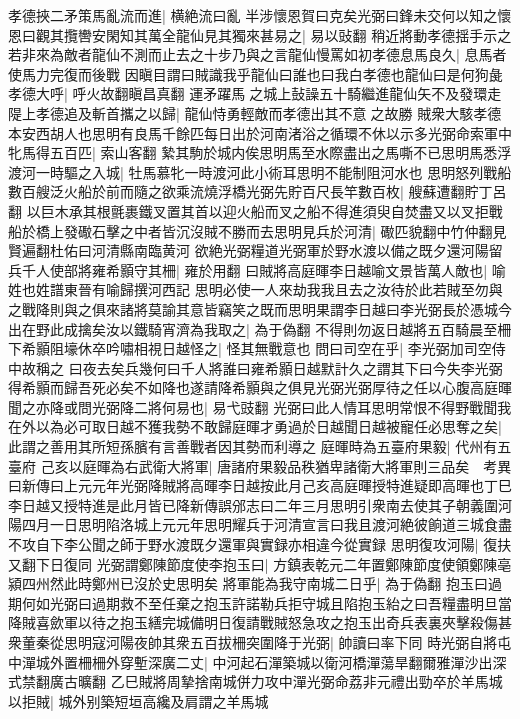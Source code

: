 孝德挾二矛策馬亂流而進|{
	横絶流曰亂}
半涉懷恩賀曰克矣光弼曰鋒未交何以知之懷恩曰觀其攬轡安閑知其萬全龍仙見其獨來甚易之|{
	易以䜴翻}
稍近將動孝德揺手示之若非來為敵者龍仙不測而止去之十步乃與之言龍仙慢罵如初孝德息馬良久|{
	息馬者使馬力完復而後戰}
因瞋目謂曰賊識我乎龍仙曰誰也曰我白孝德也龍仙曰是何狗彘孝德大呼|{
	呼火故翻瞋昌真翻}
運矛躍馬之城上鼔譟五十騎繼進龍仙矢不及發環走隄上孝德追及斬首攜之以歸|{
	龍仙恃勇輕敵而孝德出其不意之故勝}
賊衆大駭孝德本安西胡人也思明有良馬千餘匹每日出於河南渚浴之循環不休以示多光弼命索軍中牝馬得五百匹|{
	索山客翻}
縶其駒於城内俟思明馬至水際盡出之馬嘶不已思明馬悉浮渡河一時驅之入城|{
	牡馬慕牝一時渡河此小術耳思明不能制阻河水也}
思明怒列戰船數百艘泛火船於前而隨之欲乘流燒浮橋光弼先貯百尺長竿數百枚|{
	艘蘇遭翻貯丁呂翻}
以巨木承其根氈裹鐵叉置其首以迎火船而叉之船不得進須臾自焚盡又以叉拒戰船於橋上發礮石擊之中者皆沉沒賊不勝而去思明見兵於河清|{
	礮匹貌翻中竹仲翻見賢遍翻杜佑曰河清縣南臨黄河}
欲絶光弼糧道光弼軍於野水渡以備之既夕還河陽留兵千人使部將雍希顥守其柵|{
	雍於用翻}
曰賊將高庭暉李日越喻文景皆萬人敵也|{
	喻姓也姓譜東晉有喻歸撰河西記}
思明必使一人來劫我我且去之汝待於此若賊至勿與之戰降則與之俱來諸將莫諭其意皆竊笑之既而思明果謂李日越曰李光弼長於憑城今出在野此成擒矣汝以鐵騎宵濟為我取之|{
	為于偽翻}
不得則勿返日越將五百騎晨至柵下希顥阻壕休卒吟嘯相視日越怪之|{
	怪其無戰意也}
問曰司空在乎|{
	李光弼加司空侍中故稱之}
曰夜去矣兵幾何曰千人將誰曰雍希顥日越默計久之謂其下曰今失李光弼得希顥而歸吾死必矣不如降也遂請降希顥與之俱見光弼光弼厚待之任以心腹高庭暉聞之亦降或問光弼降二將何易也|{
	易弋豉翻}
光弼曰此人情耳思明常恨不得野戰聞我在外以為必可取日越不獲我勢不敢歸庭暉才勇過於日越聞日越被寵任必思奪之矣|{
	此謂之善用其所短孫臏有言善戰者因其勢而利導之}
庭暉時為五臺府果毅|{
	代州有五臺府}
己亥以庭暉為右武衛大將軍|{
	唐諸府果毅品秩猶卑諸衛大將軍則三品矣　考異曰新傳曰上元元年光弼降賊將高暉李日越按此月己亥高庭暉授特進疑即高暉也丁巳李日越又授特進是此月皆已降新傳誤邠志曰二年三月思明引衆南去使其子朝義圍河陽四月一日思明陷洛城上元元年思明耀兵于河清宣言曰我且渡河絶彼餉道三城食盡不攻自下李公聞之師于野水渡既夕還軍與實録亦相違今從實録}
思明復攻河陽|{
	復扶又翻下日復同}
光弼謂鄭陳節度使李抱玉曰|{
	方鎮表乾元二年置鄭陳節度使領鄭陳亳潁四州然此時鄭州已沒於史思明矣}
將軍能為我守南城二日乎|{
	為于偽翻}
抱玉曰過期何如光弼曰過期救不至任棄之抱玉許諾勒兵拒守城且陷抱玉紿之曰吾糧盡明旦當降賊喜歛軍以待之抱玉繕完城備明日復請戰賊怒急攻之抱玉出奇兵表裏夾擊殺傷甚衆董秦從思明寇河陽夜帥其衆五百拔柵突圍降于光弼|{
	帥讀曰率下同}
時光弼自將屯中潬城外置柵柵外穿塹深廣二丈|{
	中河起石潬築城以衛河橋潬蕩旱翻爾雅潬沙出深式禁翻廣古曠翻}
乙巳賊將周摯捨南城併力攻中潬光弼命荔非元禮出勁卒於羊馬城以拒賊|{
	城外别築短垣高纔及肩謂之羊馬城}
